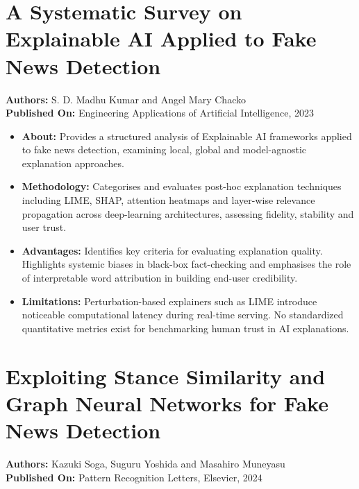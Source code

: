 \documentclass[12pt,a4paper,oneside]{report}
\begin{document}
\section{A Systematic Survey on Explainable AI Applied to Fake News Detection}
\textbf{Authors:} S. D. Madhu Kumar and Angel Mary Chacko\\
\textbf{Published On:} Engineering Applications of Artificial Intelligence, 2023

\begin{itemize}[leftmargin=*, itemsep=2pt]
  \item \textbf{About:} Provides a structured analysis of Explainable AI frameworks
        applied to fake news detection, examining local, global and model-agnostic
        explanation approaches.
  \item \textbf{Methodology:} Categorises and evaluates post-hoc explanation techniques
        including LIME, SHAP, attention heatmaps and layer-wise relevance propagation
        across deep-learning architectures, assessing fidelity, stability and user
        trust.
  \item \textbf{Advantages:} Identifies key criteria for evaluating explanation quality.
        Highlights systemic biases in black-box fact-checking and emphasises the role of
        interpretable word attribution in building end-user credibility.
  \item \textbf{Limitations:} Perturbation-based explainers such as LIME introduce
        noticeable computational latency during real-time serving. No standardized
        quantitative metrics exist for benchmarking human trust in AI explanations.
\end{itemize}

\section{Exploiting Stance Similarity and Graph Neural Networks for Fake News Detection}
\textbf{Authors:} Kazuki Soga, Suguru Yoshida and Masahiro Muneyasu\\
\textbf{Published On:} Pattern Recognition Letters, Elsevier, 2024
\end{document}
